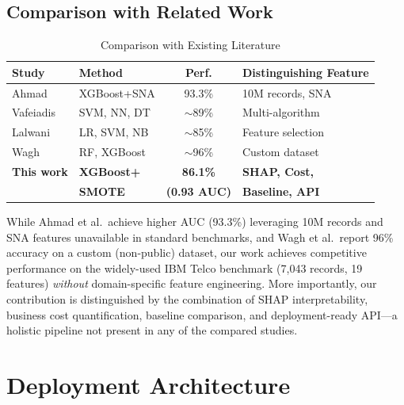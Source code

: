 \documentclass[10pt, conference, letterpaper]{IEEEtran}
\begin{document}
\subsection{Comparison with Related Work}

\begin{table}[htbp]
\caption{Comparison with Existing Literature}
\label{tab:comparison}
\begin{center}
\begin{tabular}{@{}p{1.8cm}p{1.7cm}cp{2.2cm}@{}}
\toprule
\textbf{Study} & \textbf{Method} & \textbf{Perf.} & \textbf{Distinguishing Feature} \\
\midrule
Ahmad~\cite{ahmad2019churn} & XGBoost+SNA & 93.3\% & 10M records, SNA \\
\addlinespace
Vafeiadis~\cite{vafeiadis2015comparison} & SVM, NN, DT & $\sim$89\% & Multi-algorithm \\
\addlinespace
Lalwani~\cite{lalwani2022churn} & LR, SVM, NB & $\sim$85\% & Feature selection \\
\addlinespace
Wagh~\cite{wagh2024churn} & RF, XGBoost & $\sim$96\% & Custom dataset \\
\addlinespace
\textbf{This work} & \textbf{XGBoost+} & \textbf{86.1\%} & \textbf{SHAP, Cost,} \\
 & \textbf{SMOTE} & \textbf{(0.93 AUC)} & \textbf{Baseline, API} \\
\bottomrule
\end{tabular}
\end{center}
\end{table}

While Ahmad et al.\ achieve higher AUC (93.3\%) leveraging 10M records and SNA features unavailable in standard benchmarks, and Wagh et al.\ report 96\% accuracy on a custom (non-public) dataset, our work achieves competitive performance on the widely-used IBM Telco benchmark (7,043 records, 19 features) \textit{without} domain-specific feature engineering. More importantly, our contribution is distinguished by the combination of SHAP interpretability, business cost quantification, baseline comparison, and deployment-ready API---a holistic pipeline not present in any of the compared studies.

\section{Deployment Architecture}
\label{sec:deployment}
\end{document}
